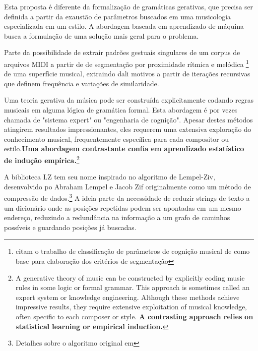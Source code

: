 \documentclass[
	12pt,				%
	openright,			%
	twoside,			%
	a4paper,			%
	english,			%
	french,				%
	spanish,			%
	brazil				%
	]{abntex2}
\begin{document}
Esta proposta é diferente da formalização de gramáticas gerativas, que precisa ser definida a partir da exaustão de parâmetros buscados em uma musicologia especializada em um estilo. A abordagem baseada em aprendizado de máquina busca a formulação de uma solução mais geral para o problema.

Parte da possibilidade de extrair padrões gestuais singulares de um corpus de arquivos MIDI a partir de de segmentação por proximidade rítmica e melódica \footnote{  citam o trabalho de classificação de parâmetros de cognição musical de  como base para elaboração dos critérios de segmentação } de uma superfície musical, extraindo dali motivos a partir de iterações recursivas que definem frequência e variações de similaridade.

\begin{citacao}
Uma teoria gerativa da música pode ser construída explicitamente codando regras musicais em alguma lógica de gramática formal. Esta abordagem é por vezes chamada de "sistema expert" ou "engenharia de cognição". Apesar destes métodos atingirem resultados impressionantes, eles requerem uma extensiva exploração do conhecimento musical, frequentemente específica para cada compositor ou estilo.\textbf{Uma abordagem contrastante confia em aprendizado estatístico de indução empírica.}\cite[ p.74, grifos nossos]{dubnov2003using}\footnote{A generative theory of music can be constructed by explicitly coding music rules in some logic or formal grammar. This approach is sometimes called an expert system or knowledge engineering. Although these methods achieve impressive results, they require extensive exploitation of musical knowledge, often specific to each composer or style.
\textbf{A contrasting approach relies on statistical learning or empirical induction.}\cite[ p.74, grifos nossos]{dubnov2003using}}
\end{citacao}

A biblioteca LZ tem seu nome inspirado no algoritmo de Lempel-Ziv, desenvolvido po Abraham Lempel e Jacob Zif originalmente como um método de compressão de dados.\footnote{Detalhes sobre o algoritmo original em } A ideia parte da necessidade de reduzir strings de texto a um dicionário onde as posições repetidas podem ser apontadas em um mesmo endereço, reduzindo a redundância na informação a um grafo de caminhos possíveis e guardando posições já buscadas.
\end{document}
